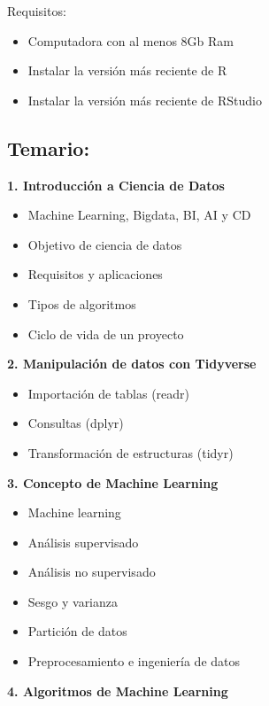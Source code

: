 \documentclass[
]{book}
\providecommand{\tightlist}{%
  \setlength{\itemsep}{0pt}\setlength{\parskip}{0pt}}
\begin{document}
Requisitos:

\begin{itemize}
\tightlist
\item
  Computadora con al menos 8Gb Ram
\item
  Instalar la versión más reciente de R
\item
  Instalar la versión más reciente de RStudio
\end{itemize}

\hypertarget{temario}{%
\subsection*{Temario:}\label{temario}}

\textbf{1. Introducción a Ciencia de Datos}

\begin{itemize}
\tightlist
\item
  Machine Learning, Bigdata, BI, AI y CD
\item
  Objetivo de ciencia de datos
\item
  Requisitos y aplicaciones
\item
  Tipos de algoritmos
\item
  Ciclo de vida de un proyecto
\end{itemize}

\textbf{2. Manipulación de datos con Tidyverse}

\begin{itemize}
\tightlist
\item
  Importación de tablas (readr)
\item
  Consultas (dplyr)
\item
  Transformación de estructuras (tidyr)
\end{itemize}

\textbf{3. Concepto de Machine Learning}

\begin{itemize}
\tightlist
\item
  Machine learning
\item
  Análisis supervisado
\item
  Análisis no supervisado
\item
  Sesgo y varianza
\item
  Partición de datos
\item
  Preprocesamiento e ingeniería de datos
\end{itemize}

\textbf{4. Algoritmos de Machine Learning}
\end{document}

